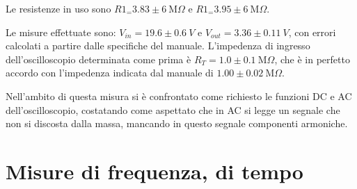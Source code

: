 \documentclass[10pt,a4paper]{article}
\begin{document}
Le resistenze in uso sono $R1_=3.83 \pm 6~\text{M}\Omega$ e  $R1_=3.95 \pm 6~\text{M}\Omega$.

Le misure effettuate sono: $V_{in}=19.6 \pm 0.6 ~V$ e $V_{out}= 3.36 \pm 0.11 ~ V$, con errori calcolati a partire dalle specifiche del manuale. L'impedenza di ingresso dell'oscilloscopio determinata come prima è $R_T=1.0 \pm 0.1 ~ \text{M}\Omega$, che è in perfetto accordo con l'impedenza indicata dal manuale di $1.00 \pm 0.02 ~\text{M} \Omega$.

Nell'ambito di questa misura si è confrontato come richiesto le funzioni DC e AC dell'oscilloscopio, costatando come aspettato che in AC si legge un segnale che non si discosta dalla massa, mancando in questo segnale componenti armoniche.

\section{Misure di frequenza, di tempo}

\end{document}
